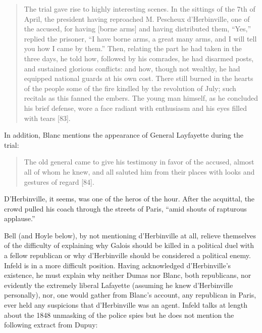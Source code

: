 \documentclass[12pt]{article}
\begin{document}
\begin{quote}
The trial gave rise to highly interesting scenes. In the sittings of the 7th of April, the president having reproached M. Pescheux d'Herbinville, one of the accused, for having [borne arms] and having distributed them, ``Yes,'' replied the prisoner, ``I have borne arms, a great many arms, and I will tell you how I came by them.'' Then, relating the part he had taken in the three days, he told how, followed by his comrades, he had disarmed posts, and sustained glorious conflicts: and how, though not wealthy, he had equipped national guards at his own cost. There still burned in the hearts of the people some of the fire kindled by the revolution of July; such recitals as this fanned the embers. The young man himself, as he concluded his brief defense, wore a face radiant with enthusiasm and his eyes filled with tears [83].
\end{quote}
In addition, Blanc mentions the appearance of General Layfayette during the trial:

\begin{quote}
The old general came to give his testimony in favor of the accused, almost all of whom he knew, and all saluted him from their places with looks and gestures of regard [84].
\end{quote}
D'Herbinville, it seems, was one of the heros of the hour. After the acquittal, the crowd pulled his coach through the streets of Paris, ``amid shouts of rapturous applause.''

Bell (and Hoyle below), by not mentioning d'Herbinville at all, relieve themselves of the difficulty of explaining why Galois should be killed in a political duel with a fellow republican or why d'Herbinville should be considered a political enemy. Infeld is in a more difficult position. Having acknowledged d'Herbinville's existence, he must explain why neither Dumas nor Blanc, both republicans, nor evidently the extremely liberal Lafayette (assuming he knew d'Herbinville personally), nor, one would gather from Blanc's account, any republican in Paris, ever held any suspicions that d'Herbinville was an agent. Infeld talks at length about the 1848 unmasking of the police spies but he does not mention the following extract from Dupuy:
\end{document}
